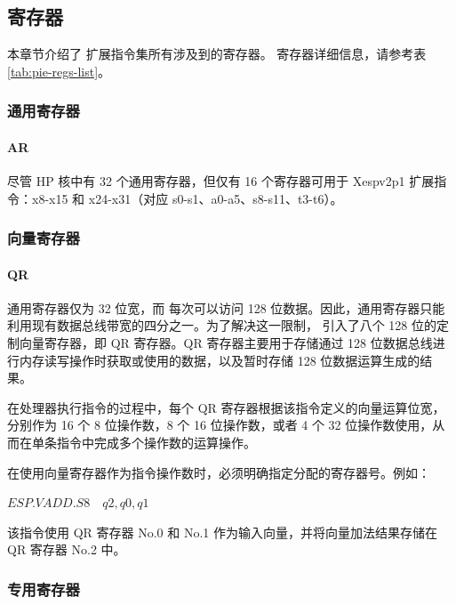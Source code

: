 \documentclass[main\_\_CN.tex]{subfiles}
\begin{document}
\subsection{寄存器}

本章节介绍了 \chipname{} 扩展指令集所有涉及到的寄存器。
寄存器详细信息，请参考表 \ref{tab:pie-regs-list}。
\clearpage


\subsubsection{通用寄存器}
\paragraph{AR}


尽管 HP 核中有 32 个通用寄存器，但仅有 16 个寄存器可用于 Xespv2p1 扩展指令：x8-x15 和 x24-x31（对应 s0-s1、a0-a5、s8-s11、t3-t6）。



\subsubsection{向量寄存器}

\paragraph{QR}

通用寄存器仅为 32 位宽，而 \chipname{} 每次可以访问 128 位数据。因此，通用寄存器只能利用现有数据总线带宽的四分之一。为了解决这一限制，\chipname{} 引入了八个 128 位的定制向量寄存器，即 QR 寄存器。QR 寄存器主要用于存储通过 128 位数据总线进行内存读写操作时获取或使用的数据，以及暂时存储 128 位数据运算生成的结果。

在处理器执行指令的过程中，每个 QR 寄存器根据该指令定义的向量运算位宽，分别作为 16 个 8 位操作数，8 个 16 位操作数，或者 4 个 32 位操作数使用，从而在单条指令中完成多个操作数的运算操作。

在使用向量寄存器作为指令操作数时，必须明确指定分配的寄存器号。例如：

\begin{center}
    $\hyperref[instruction:ESPVADDS8]{ESP.VADD.S8} \hspace{1em} q2, q0, q1$
    \end{center}

该指令使用 QR 寄存器 No.0 和 No.1 作为输入向量，并将向量加法结果存储在 QR 寄存器 No.2 中。

\subsubsection{专用寄存器}
\label{sec:pie-spec-reg}
\end{document}
